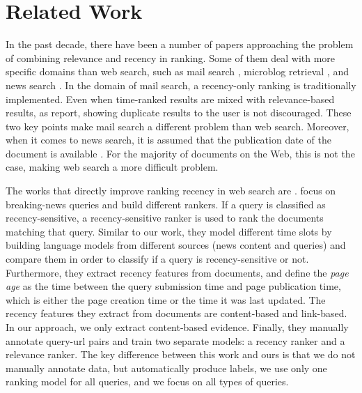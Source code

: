\chapter{Related Work}
\label{ch:relatedwork}



In the past decade, there have been a number of papers approaching the problem of combining relevance and recency in ranking. Some of them deal with more specific domains than web search, such as mail search \citep{carmel2017promoting}, microblog retrieval \citep{efron2012query}, and news search \citep{dakka2012answering}. In the domain of mail search, a recency-only ranking is traditionally implemented. Even when time-ranked results are mixed with relevance-based results, as \cite{carmel2017promoting} report, showing duplicate results to the user is not discouraged. These two key points make mail search a different problem than web search. Moreover, when it comes to news search, it is assumed that the publication date of the document is available \citep{dakka2012answering}. For the majority of documents on the Web, this is not the case, making web search a more difficult problem.

The works that directly improve ranking recency in web search are \citep{dong2010towards,dong2010time,dai2011learning,styskin2011recency}. \citet{dong2010towards} focus on breaking-news queries and build different rankers. If a query is classified as recency-sensitive, a recency-sensitive ranker is used to rank the documents matching that query. Similar to our work, they model different time slots by building language models from different sources (news content and queries) and compare them in order to classify if a query is recency-sensitive or not. Furthermore, they extract recency features from documents, and define the \textit{page age} as the time between the query submission time and page publication time, which is either the page creation time or the time it was last updated. The recency features they extract from documents are content-based and link-based. In our approach, we only extract content-based evidence. Finally, they manually annotate query-url pairs and train two separate models: a recency ranker and a relevance ranker. The key difference between this work and ours is that we do not manually annotate data, but automatically produce labels, we use only one ranking model for all queries, and we focus on all types of queries.

